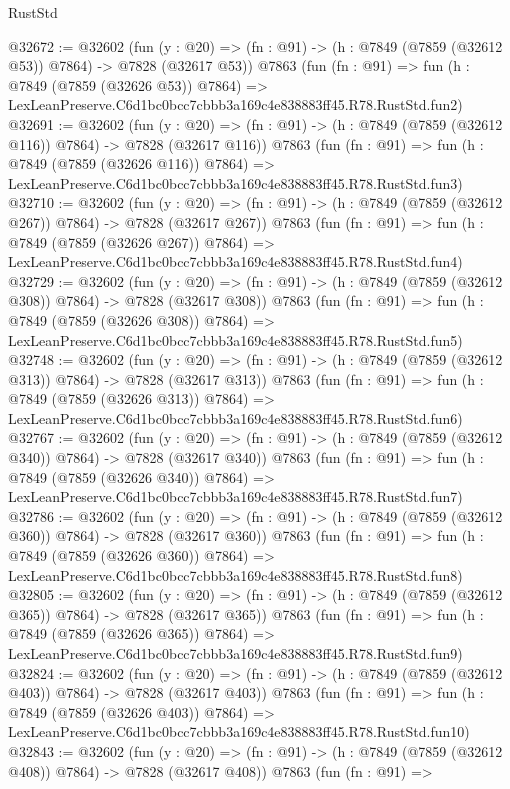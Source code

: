 \begin{lexlean}{RustStd}
\begin{coremodule}
@32672 := @32602
    (fun (y : @20) => (fn : @91) -> (h : @7849 (@7859 (@32612 @53)) @7864) -> @7828 (@32617 @53))
    @7863
    (fun (fn : @91) =>
    fun (h : @7849 (@7859 (@32626 @53)) @7864) =>
    LexLeanPreserve.C6d1bc0bcc7cbbb3a169c4e838883ff45.R78.RustStd.fun2)
@32691 := @32602
    (fun (y : @20) => (fn : @91) -> (h : @7849 (@7859 (@32612 @116)) @7864) -> @7828 (@32617 @116))
    @7863
    (fun (fn : @91) =>
    fun (h : @7849 (@7859 (@32626 @116)) @7864) =>
    LexLeanPreserve.C6d1bc0bcc7cbbb3a169c4e838883ff45.R78.RustStd.fun3)
@32710 := @32602
    (fun (y : @20) => (fn : @91) -> (h : @7849 (@7859 (@32612 @267)) @7864) -> @7828 (@32617 @267))
    @7863
    (fun (fn : @91) =>
    fun (h : @7849 (@7859 (@32626 @267)) @7864) =>
    LexLeanPreserve.C6d1bc0bcc7cbbb3a169c4e838883ff45.R78.RustStd.fun4)
@32729 := @32602
    (fun (y : @20) => (fn : @91) -> (h : @7849 (@7859 (@32612 @308)) @7864) -> @7828 (@32617 @308))
    @7863
    (fun (fn : @91) =>
    fun (h : @7849 (@7859 (@32626 @308)) @7864) =>
    LexLeanPreserve.C6d1bc0bcc7cbbb3a169c4e838883ff45.R78.RustStd.fun5)
@32748 := @32602
    (fun (y : @20) => (fn : @91) -> (h : @7849 (@7859 (@32612 @313)) @7864) -> @7828 (@32617 @313))
    @7863
    (fun (fn : @91) =>
    fun (h : @7849 (@7859 (@32626 @313)) @7864) =>
    LexLeanPreserve.C6d1bc0bcc7cbbb3a169c4e838883ff45.R78.RustStd.fun6)
@32767 := @32602
    (fun (y : @20) => (fn : @91) -> (h : @7849 (@7859 (@32612 @340)) @7864) -> @7828 (@32617 @340))
    @7863
    (fun (fn : @91) =>
    fun (h : @7849 (@7859 (@32626 @340)) @7864) =>
    LexLeanPreserve.C6d1bc0bcc7cbbb3a169c4e838883ff45.R78.RustStd.fun7)
@32786 := @32602
    (fun (y : @20) => (fn : @91) -> (h : @7849 (@7859 (@32612 @360)) @7864) -> @7828 (@32617 @360))
    @7863
    (fun (fn : @91) =>
    fun (h : @7849 (@7859 (@32626 @360)) @7864) =>
    LexLeanPreserve.C6d1bc0bcc7cbbb3a169c4e838883ff45.R78.RustStd.fun8)
@32805 := @32602
    (fun (y : @20) => (fn : @91) -> (h : @7849 (@7859 (@32612 @365)) @7864) -> @7828 (@32617 @365))
    @7863
    (fun (fn : @91) =>
    fun (h : @7849 (@7859 (@32626 @365)) @7864) =>
    LexLeanPreserve.C6d1bc0bcc7cbbb3a169c4e838883ff45.R78.RustStd.fun9)
@32824 := @32602
    (fun (y : @20) => (fn : @91) -> (h : @7849 (@7859 (@32612 @403)) @7864) -> @7828 (@32617 @403))
    @7863
    (fun (fn : @91) =>
    fun (h : @7849 (@7859 (@32626 @403)) @7864) =>
    LexLeanPreserve.C6d1bc0bcc7cbbb3a169c4e838883ff45.R78.RustStd.fun10)
@32843 := @32602
    (fun (y : @20) => (fn : @91) -> (h : @7849 (@7859 (@32612 @408)) @7864) -> @7828 (@32617 @408))
    @7863
    (fun (fn : @91) =>

\end{coremodule}
\end{lexlean}
